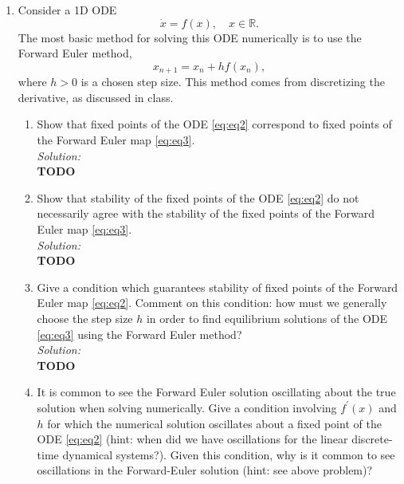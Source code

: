 \documentclass[10pt]{amsart}
\theoremstyle{nonumberplain}
\begin{document}
\begin{enumerate}[label={\bf {\arabic*}:}]
\begin{enumerate}
\end{enumerate}

\item Consider a 1D ODE
\begin{equation}
\dot x = f(x), \quad x \in \mathbb R.
\label{eq:eq2}
\end{equation}
The most basic method for solving this ODE numerically is to use the Forward Euler method,
\begin{equation}
x_{n + 1} = x_n + hf(x_n),
\label{eq:eq3}
\end{equation}
where $h > 0$ is a chosen step size.
This method comes from discretizing the derivative, as discussed in class. \\

\begin{enumerate}
\item Show that fixed points of the ODE \eqref{eq:eq2} correspond to fixed points of the Forward Euler map \eqref{eq:eq3}. \\

\textit{Solution:} \\
\textbf{TODO} \\

\item Show that stability of the fixed points of the ODE \eqref{eq:eq2} do not necessarily agree with the stability of the fixed points of the Forward Euler map \eqref{eq:eq3}. \\

\textit{Solution:} \\
\textbf{TODO} \\

\item Give a condition which guarantees stability of fixed points of the Forward Euler map \eqref{eq:eq2}. 
Comment on this condition: how must we generally choose the step size $h$ in order to find equilibrium solutions of the ODE \eqref{eq:eq3} using the Forward Euler method? \\

\textit{Solution:} \\
\textbf{TODO} \\

\item It is common to see the Forward Euler solution oscillating about the true solution when solving numerically.
Give a condition involving $f^\prime(x)$ and $h$ for which the numerical solution oscillates about a fixed point of the ODE \eqref{eq:eq2} (hint: when did we have oscillations for the linear discrete-time dynamical systems?).
Given this condition, why is it common to see oscillations in the Forward-Euler solution (hint: see above problem)? \\


\end{enumerate}
\end{enumerate}
\end{document}
